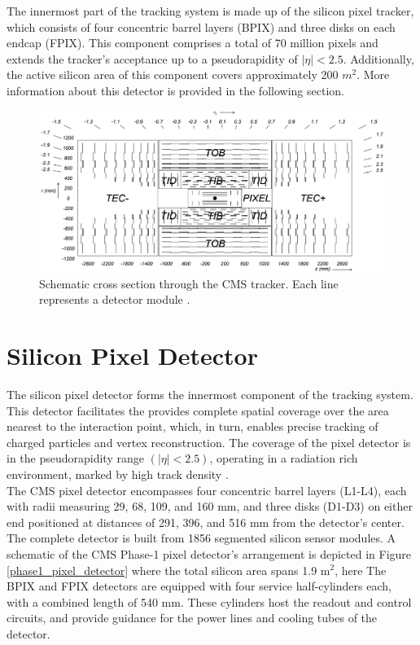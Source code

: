 The innermost part of the tracking system is made up of the silicon pixel tracker, which consists of four concentric barrel layers (BPIX) and three disks on each endcap (FPIX). This component comprises a total of 70 million pixels and extends the tracker's acceptance up to a pseudorapidity of $|\eta| < 2.5$. Additionally, the active silicon area of this component covers approximately 200 $m^2$. More information about this detector is provided in the following section.

\begin{center}
  \begin{figure}[ht]
    \centering
    \includegraphics[scale=.23]{Chapter2/strip_layout.png}
    \caption[Schematic cross section through the CMS tracker]{Schematic cross section through the CMS tracker. Each line represents a detector module \cite{CMS_Exp_2008}.}
    \label{strip_layout}
  \end{figure}
\end{center}


\section{Silicon Pixel Detector}

The silicon pixel detector  forms the innermost component of the tracking system. This detector facilitates the provides complete spatial coverage over the area nearest to the interaction point, which, in turn, enables precise tracking of charged particles and vertex reconstruction. The coverage of the pixel detector is in the pseudorapidity range $(|\eta| < 2.5)$, operating in a radiation rich environment, marked by high track density \cite{phase1_Pixel_Detector}.\\

The CMS pixel detector encompasses four concentric barrel layers (L1-L4), each with radii measuring 29, 68, 109, and 160 mm, and three disks (D1-D3) on either end positioned at distances of 291, 396, and 516 mm from the detector's center. The complete detector is built from 1856 segmented silicon sensor modules.  A schematic of the CMS Phase-1 pixel detector's arrangement is depicted in Figure \ref{phase1_pixel_detector} where the total silicon area spans 1.9 $\text{m}^{2}$, here The BPIX and FPIX detectors are equipped with four service half-cylinders each, with a combined length of 540 mm. These cylinders host the readout and control circuits, and provide guidance for the power lines and cooling tubes of the detector.

